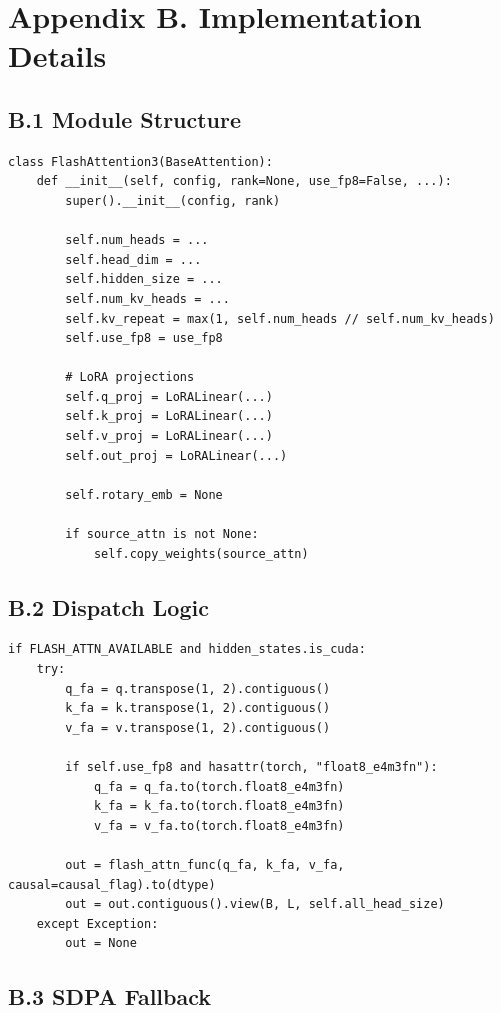 \section{Appendix B. Implementation Details}

\subsection{B.1 Module Structure}

\begin{lstlisting}
class FlashAttention3(BaseAttention):
    def __init__(self, config, rank=None, use_fp8=False, ...):
        super().__init__(config, rank)
        
        self.num_heads = ...
        self.head_dim = ...
        self.hidden_size = ...
        self.num_kv_heads = ...
        self.kv_repeat = max(1, self.num_heads // self.num_kv_heads)
        self.use_fp8 = use_fp8
        
        # LoRA projections
        self.q_proj = LoRALinear(...)
        self.k_proj = LoRALinear(...)
        self.v_proj = LoRALinear(...)
        self.out_proj = LoRALinear(...)
        
        self.rotary_emb = None
        
        if source_attn is not None:
            self.copy_weights(source_attn)
\end{lstlisting}

\subsection{B.2 Dispatch Logic}

\begin{lstlisting}
if FLASH_ATTN_AVAILABLE and hidden_states.is_cuda:
    try:
        q_fa = q.transpose(1, 2).contiguous()
        k_fa = k.transpose(1, 2).contiguous()
        v_fa = v.transpose(1, 2).contiguous()
        
        if self.use_fp8 and hasattr(torch, "float8_e4m3fn"):
            q_fa = q_fa.to(torch.float8_e4m3fn)
            k_fa = k_fa.to(torch.float8_e4m3fn)
            v_fa = v_fa.to(torch.float8_e4m3fn)
        
        out = flash_attn_func(q_fa, k_fa, v_fa, causal=causal_flag).to(dtype)
        out = out.contiguous().view(B, L, self.all_head_size)
    except Exception:
        out = None
\end{lstlisting}

\subsection{B.3 SDPA Fallback}

